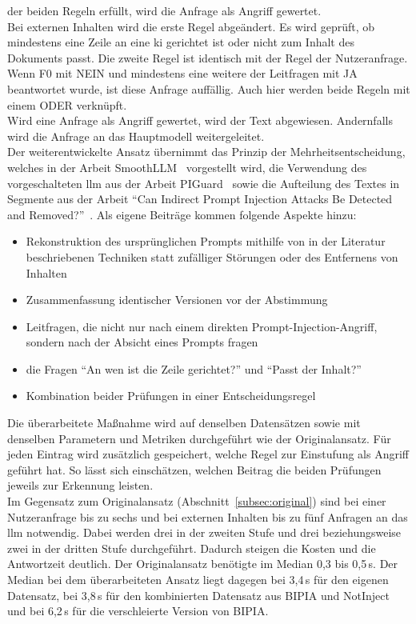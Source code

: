 der beiden Regeln erfüllt, wird die Anfrage als Angriff gewertet. \\
Bei externen Inhalten wird die erste Regel abgeändert. Es wird geprüft, ob mindestens eine Zeile an eine \ac{ki} gerichtet ist oder nicht zum Inhalt des Dokuments passt.
Die zweite Regel ist identisch mit der Regel der Nutzeranfrage. Wenn F0 mit NEIN und mindestens eine weitere der Leitfragen mit JA beantwortet wurde, ist diese 
Anfrage auffällig. Auch hier werden beide Regeln mit einem ODER verknüpft. \\
Wird eine Anfrage als Angriff gewertet, wird der Text abgewiesen. Andernfalls wird die Anfrage an das Hauptmodell weitergeleitet. \\
Der weiterentwickelte Ansatz übernimmt das Prinzip der Mehrheitsentscheidung, welches in der Arbeit SmoothLLM~\cite{sm40} vorgestellt wird, die Verwendung des 
vorgeschalteten \ac{llm} aus der Arbeit PIGuard~\cite[30426]{sm37} sowie die Aufteilung des Textes in Segmente aus der Arbeit 
\enquote{Can Indirect Prompt Injection Attacks Be Detected and Removed?}~\cite[18193]{sm41}. 
Als eigene Beiträge kommen folgende
Aspekte hinzu:
\begin{itemize}
    \item Rekonstruktion des ursprünglichen Prompts mithilfe von in der Literatur beschriebenen Techniken statt zufälliger Störungen oder des Entfernens von Inhalten
    \item Zusammenfassung identischer Versionen vor der Abstimmung
    \item Leitfragen, die nicht nur nach einem direkten Prompt-Injection-Angriff, sondern nach der Absicht eines Prompts fragen
    \item die Fragen \enquote{An wen ist die Zeile gerichtet?} und \enquote{Passt der Inhalt?}
    \item Kombination beider Prüfungen in einer Entscheidungsregel
\end{itemize}
Die überarbeitete Maßnahme wird auf denselben Datensätzen sowie mit denselben Parametern und Metriken durchgeführt wie der Originalansatz. Für jeden Eintrag wird
zusätzlich gespeichert, welche Regel zur Einstufung als Angriff geführt hat. So lässt sich einschätzen, welchen Beitrag die beiden Prüfungen jeweils zur 
Erkennung leisten. \\
Im Gegensatz zum Originalansatz (Abschnitt~\ref{subsec:original}) sind bei einer Nutzeranfrage bis zu sechs und bei externen Inhalten bis zu fünf Anfragen an das \ac{llm} notwendig. Dabei werden
drei in der zweiten Stufe und drei beziehungsweise zwei in der dritten Stufe durchgeführt. Dadurch steigen die Kosten und die Antwortzeit deutlich. Der Originalansatz
benötigte im Median 0,3 bis 0,5\,s. Der Median bei dem überarbeiteten Ansatz liegt dagegen bei 3,4\,s für den eigenen Datensatz, bei 3,8\,s für den kombinierten 
Datensatz aus BIPIA und NotInject
und bei 6,2\,s für die verschleierte Version von BIPIA.

